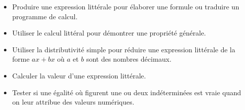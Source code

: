 \documentclass[a4paper,12pt,fleqn]{article}
\begin{document}
\begin{itemize}																								
	\item {}	Produire une expression littérale pour élaborer une formule ou traduire un programme de calcul.																								
	\item {}	Utiliser le calcul littéral pour démontrer une propriété générale.																								
	\item {}	Utiliser la distributivité simple pour réduire une expression littérale de la forme $ax + bx$ où $a$ et $b$ sont des nombres décimaux.																								
	\item {}	Calculer la valeur d’une expression littérale.																								
	\item {}	Tester si une égalité où figurent une ou deux indéterminées est vraie quand on leur attribue des valeurs numériques.																							
\end{itemize}
\end{document}
